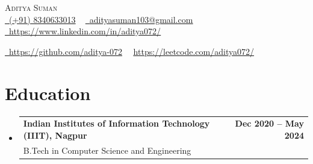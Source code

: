 \documentclass[letterpaper,11pt]{article}
\makeatletter
\newcommand{\resumeSubheading}[4]{
  \vspace{-2pt}\item
    \begin{tabular*}{1.0\textwidth}[t]{l@{\extracolsep{\fill}}r}
      \textbf{#1} & \textbf{\small #2} \\
      {\small#3} & {\small #4} \\
    \end{tabular*}\vspace{-7pt}
}
\newcommand{\resumeSubHeadingListStart}{\begin{itemize}[leftmargin=0.0in, label={}]}
\newcommand{\resumeSubHeadingListEnd}{\end{itemize}}
\makeatother
\begin{document}
\begin{center}
{\Huge \scshape Aditya Suman} \\ \vspace{5pt}
\vspace{5pt}
\small
\href{tel:+918340633013}{\raisebox{-0.25\height}\faPhone\ {\color{black}\underline{(+91) 8340633013}}}  ~
\href{mailto:adityasuman103@gmail.com}{\raisebox{-0.25\height}\faEnvelope\  {\color{black}\underline{adityasuman103@gmail.com}}} ~
\href{https://www.linkedin.com/in/aditya072/}{\raisebox{-0.25\height}\faLinkedin\ {\color{black}\underline{https://www.linkedin.com/in/aditya072/}}}  ~
\\ \vspace{5pt}

\href{https://github.com/aditya-072}{\raisebox{-0.25\height}\faGithub\ {\color{black}\underline{https://github.com/aditya-072}}}~~
\href{https://leetcode.com/aditya072/}{
  {\color{black}\underline{https://leetcode.com/aditya072/}}} ~~
\vspace{2.5pt}

\end{center}

\section{Education}
\resumeSubHeadingListStart
\resumeSubheading
{Indian Institutes of Information Technology (IIIT), Nagpur}{Dec 2020 -- May 2024}
{B.Tech in Computer Science and Engineering}{}
\vspace{-1.5pt}

\resumeSubHeadingListEnd
\vspace{-5.0mm}

\end{document}
